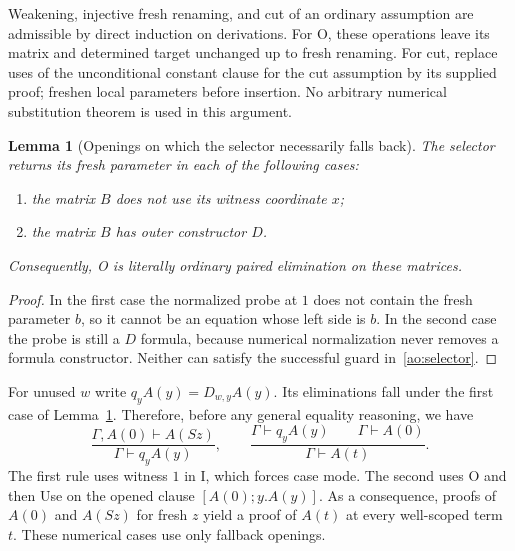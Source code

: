\documentclass[11pt,letterpaper]{article}
\newtheorem{lemma}[theorem]{Lemma}
\theoremstyle{definition}
\begin{document}
Weakening, injective fresh renaming, and cut of an ordinary assumption are
admissible by direct induction on derivations.  For O, these operations
leave its matrix and determined target unchanged up to fresh renaming.
For cut, replace uses of the unconditional constant clause for the cut
assumption by its supplied proof; freshen local parameters before insertion.
No arbitrary numerical substitution theorem is used in this argument.

\begin{lemma}[Openings on which the selector necessarily falls back]
\label{ao:safe}
The selector returns its fresh parameter in each of the following cases:
\begin{enumerate}
\item the matrix $B$ does not use its witness coordinate $x$;
\item the matrix $B$ has outer constructor $D$.
\end{enumerate}
Consequently, O is literally ordinary paired elimination on these matrices.
\end{lemma}
\begin{proof}
In the first case the normalized probe at $1$ does not contain the fresh
parameter $b$, so it cannot be an equation whose left side is $b$.
In the second case the probe is still a $D$ formula, because numerical
normalization never removes a formula constructor.  Neither can satisfy
the successful guard in~\eqref{ao:selector}.
\end{proof}

For unused $w$ write $q_yA(y)=D_{w,y}A(y)$.  Its eliminations fall under
the first case of Lemma~\ref{ao:safe}.  Therefore, before any general
equality reasoning, we have
\[
 \frac{\Gamma,A(0)\vdash A(Sz)}{\Gamma\vdash q_yA(y)},
 \qquad
 \frac{\Gamma\vdash q_yA(y)\qquad\Gamma\vdash A(0)}
      {\Gamma\vdash A(t)}.
 \tag{Q}\label{ao:q}
\]
The first rule uses witness $1$ in I, which forces case mode.  The second
uses O and then Use on the opened clause $[A(0);y.A(y)]$.  As a consequence,
proofs of $A(0)$ and $A(Sz)$ for fresh $z$ yield a proof of $A(t)$ at every
well-scoped term $t$.  These numerical cases use only fallback openings.
\end{document}
